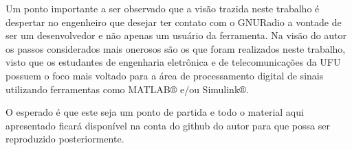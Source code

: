 \documentclass[
  12pt,				%
  openright,			%
  twoside,			%
  a4paper,			%
  english,			%
  french,				%
  spanish,			%
  brazil,				%
  ]{abntex2}
\begin{document}
Um ponto importante a ser observado que a visão trazida neste trabalho é despertar no engenheiro que desejar ter contato com o GNURadio a vontade de ser um desenvolvedor e não apenas um usuário
da ferramenta. Na visão do autor os passos considerados mais onerosos são os que foram realizados neste trabalho, visto que os estudantes de engenharia eletrônica e de telecomunicações da UFU
possuem o foco mais voltado para a área de processamento digital de sinais utilizando ferramentas como MATLAB® e/ou Simulink®.

O esperado é que este seja um ponto de partida e todo o material aqui apresentado ficará disponível na conta do github do autor para que possa ser reproduzido posteriormente.


\postextual



%
%






\end{document}
